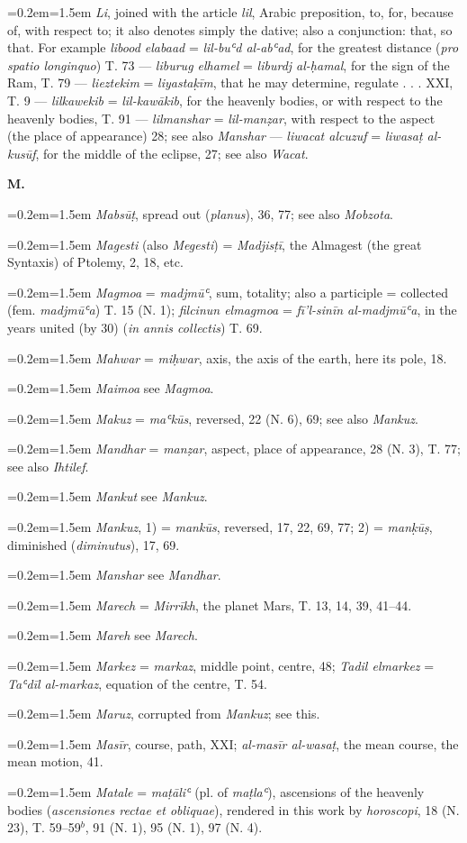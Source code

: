 \documentclass[11pt]{article}
\newcommand{\Entry}[1]{\par{\parskip=0.2em\relax\noindent\hangindent=1.5em\hangafter=1 #1\par}}
\begin{document}
\Entry{\emph{Li}, joined with the article \emph{lil}, Arabic preposition, to, for, because of, with respect to; it also denotes simply the dative; also a conjunction: that, so that. For example \emph{libood elabaad} = \emph{lil-buʿd al-abʿad}, for the greatest distance (\emph{pro spatio longinquo}) T. 73 — \emph{liburug elhamel} = \emph{liburdj al-ḥamal}, for the sign of the Ram, T. 79 — \emph{lieztekim} = \emph{liyastaḳīm}, that he may determine, regulate . . . XXI, T. 9 — \emph{lilkawekib} = \emph{lil-kawākib}, for the heavenly bodies, or with respect to the heavenly bodies, T. 91 — \emph{lilmanshar} = \emph{lil-manẓar}, with respect to the aspect (the place of appearance) 28; see also \emph{Manshar} — \emph{liwacat alcuzuf} = \emph{liwasaṭ al-kusūf}, for the middle of the eclipse, 27; see also \emph{Wacat}.}
\par\begin{center}\textbf{M.}\end{center}
\Entry{\emph{Mabsūṭ}, spread out (\emph{planus}), 36, 77; see also \emph{Mobzota}.}
\Entry{\emph{Magesti} (also \emph{Megesti}) = \emph{Madjisṭī}, the Almagest (the great Syntaxis) of Ptolemy, 2, 18, etc.}
\Entry{\emph{Magmoa} = \emph{madjmūʿ}, sum, totality; also a participle = collected (fem. \emph{madjmūʿa}) T. 15 (N. 1); \emph{filcinun elmagmoa} = \emph{fī’l-sinīn al-madjmūʿa}, in the years united (by 30) (\emph{in annis collectis}) T. 69.}
\Entry{\emph{Mahwar} = \emph{miḥwar}, axis, the axis of the earth, here its pole, 18.}
\Entry{\emph{Maimoa} see \emph{Magmoa}.}
\Entry{\emph{Makuz} = \emph{maʿkūs}, reversed, 22 (N. 6), 69; see also \emph{Mankuz}.}
\Entry{\emph{Mandhar} = \emph{manẓar}, aspect, place of appearance, 28 (N. 3), T. 77; see also \emph{Ihtilef}.}
\Entry{\emph{Mankut} see \emph{Mankuz}.}
\Entry{\emph{Mankuz}, 1) = \emph{mankūs}, reversed, 17, 22, 69, 77; 2) = \emph{manḳūṣ}, diminished (\emph{diminutus}), 17, 69.}
\Entry{\emph{Manshar} see \emph{Mandhar}.}
\Entry{\emph{Marech} = \emph{Mirrīkh}, the planet Mars, T. 13, 14, 39, 41–44.}
\Entry{\emph{Mareh} see \emph{Marech}.}
\Entry{\emph{Markez} = \emph{markaz}, middle point, centre, 48; \emph{Tadil elmarkez} = \emph{Taʿdīl al-markaz}, equation of the centre, T. 54.}
\Entry{\emph{Maruz}, corrupted from \emph{Mankuz}; see this.}
\Entry{\emph{Masīr}, course, path, XXI; \emph{al-masīr al-wasaṭ}, the mean course, the mean motion, 41.}
\Entry{\emph{Matale} = \emph{maṭāliʿ} (pl. of \emph{maṭlaʿ}), ascensions of the heavenly bodies (\emph{ascensiones rectae et obliquae}), rendered in this work by \emph{horoscopi}, 18 (N. 23), T. 59–59$^{b}$, 91 (N. 1), 95 (N. 1), 97 (N. 4).}
\end{document}
